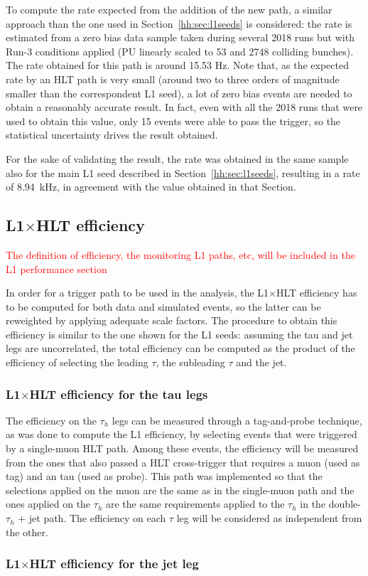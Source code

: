 \documentclass[../main.tex]{subfiles}
\begin{document}
To compute the rate expected from the addition of the new path, a similar approach than the one used in Section~\ref{hh:sec:l1seeds} is considered: the rate is estimated from a zero bias data sample taken during several 2018 runs but with Run-3 conditions applied (PU linearly scaled to 53 and 2748 colliding bunches). The rate obtained for this path is around 15.53 Hz. Note that, as the expected rate by an HLT path is very small (around two to three orders of magnitude smaller than the correspondent L1 seed), a lot of zero bias events are needed to obtain a reasonably accurate result. In fact, even with all the 2018 runs that were used to obtain this value, only 15 events were able to pass the trigger, so the statistical uncertainty drives the result obtained.

For the sake of validating the result, the rate was obtained in the same sample also for the main L1 seed described in Section~\ref{hh:sec:l1seeds}, resulting in a rate of 8.94~kHz, in agreement with the value obtained in that Section. 

\subsection{L1$\times$HLT efficiency}

\textcolor{red}{The definition of efficiency, the monitoring L1 paths, etc, will be included in the L1 performance section}

In order for a trigger path to be used in the analysis, the L1$\times$HLT efficiency has to be computed for both data and simulated events, so the latter can be reweighted by applying adequate scale factors. The procedure to obtain this efficiency is similar to the one shown for the L1 seeds: assuming the tau and jet legs are uncorrelated, the total efficiency can be computed as the product of the efficiency of selecting the leading $\tau$, the subleading $\tau$ and the jet.

\subsubsection{L1$\times$HLT efficiency for the tau legs}

The efficiency on the $\tau_h$ legs can be measured through a tag-and-probe technique, as was done to compute the L1 efficiency, by selecting events that were triggered by a single-muon HLT path. Among these events, the efficiency will be measured from the ones that also passed a HLT cross-trigger that requires a muon (used as tag) and an tau (used as probe). This path was implemented so that the selections applied on the muon are the same as in the single-muon path and the ones applied on the $\tau_h$ are the same requirements applied to the $\tau_h$ in the double-$\tau_h$ + jet path. The efficiency on each $\tau$ leg will be considered as independent from the other.


\subsubsection{L1$\times$HLT efficiency for the jet leg}




%
%
\end{document}
